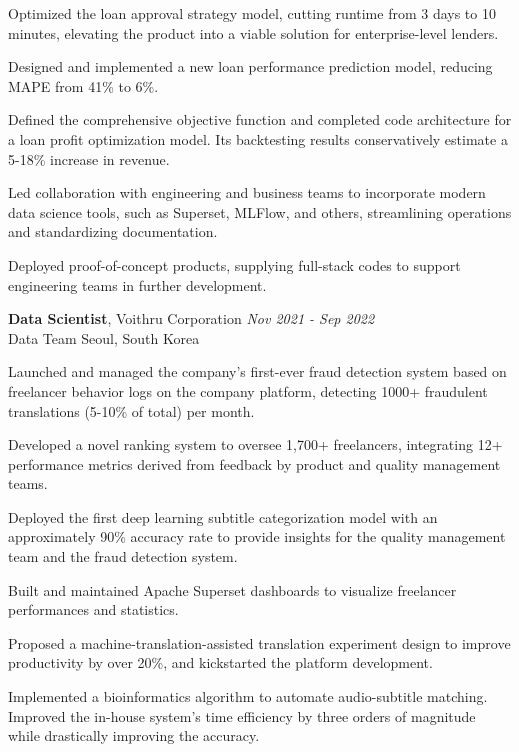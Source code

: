 \documentclass[margin,line]{./templates/resume}
\begin{document}
\begin{resume}
\begin{list2}
    \item {Optimized the loan approval strategy model, cutting runtime from 3 days to 10 minutes, elevating the product into a viable solution for enterprise-level lenders.}
    \item {Designed and implemented a new loan performance prediction model, reducing MAPE from 41\% to 6\%.}
    \item {Defined the comprehensive objective function and completed code architecture for a loan profit optimization model. Its backtesting results conservatively estimate a 5-18\% increase in revenue.}
    \item {Led collaboration with engineering and business teams to incorporate modern data science tools, such as Superset, MLFlow, and others, streamlining operations and standardizing documentation.}
    \item {Deployed proof-of-concept products, supplying full-stack codes to support engineering teams in further development.}
\end{list2}

\textbf{Data Scientist}, Voithru Corporation \hfill \textsl{Nov 2021 - Sep 2022}\\
Data Team \hfill Seoul, South Korea

\begin{list2}
    \item {Launched and managed the company's first-ever fraud detection system based on freelancer behavior logs on the company platform, detecting 1000+ fraudulent translations (5-10\% of total) per month.}
    \item {Developed a novel ranking system to oversee 1,700+ freelancers, integrating 12+ performance metrics derived from feedback by product and quality management teams.}
    \item {Deployed the first deep learning subtitle categorization model with an approximately 90\% accuracy rate to provide insights for the quality management team and the fraud detection system.}
    \item {Built and maintained Apache Superset dashboards to visualize freelancer performances and statistics.}
    \item {Proposed a machine-translation-assisted translation experiment design to improve productivity by over 20\%, and kickstarted the platform development.}
    \item {Implemented a bioinformatics algorithm to automate audio-subtitle matching. Improved the in-house system's time efficiency by three orders of magnitude while drastically improving the accuracy.}
\end{list2}



\end{resume}
\end{document}
